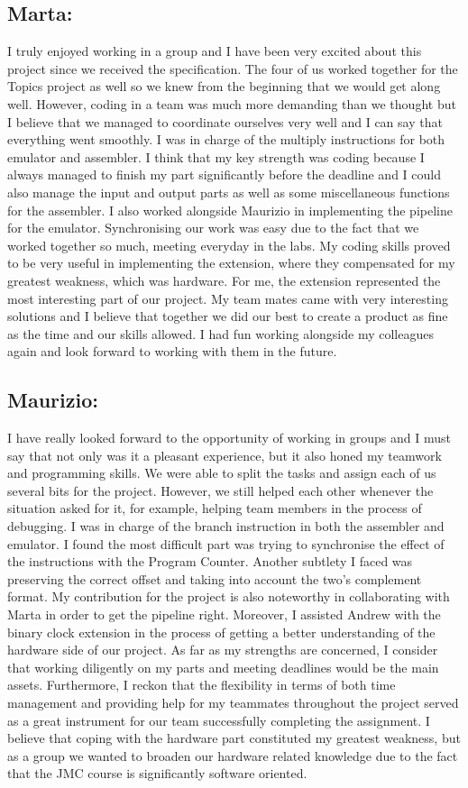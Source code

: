 \documentclass[11pt]{article}
\begin{document}
\subsection{Marta:}
I truly enjoyed working in a group and I have been very excited about this project since we received the specification.  The four of us worked together for the Topics project as well so we knew from the beginning that we would get along well. However, coding in a team was much more demanding than we thought but I believe that we managed to coordinate ourselves very well and I can say that everything went smoothly. I was in charge of the multiply instructions for both emulator and assembler. I think that my key strength was coding because I always managed to finish my part significantly before the deadline and I could also manage the input and output parts as well as some miscellaneous functions for the assembler. I also worked alongside Maurizio in implementing the pipeline for the emulator. Synchronising our work was easy due to the fact that we worked together so much, meeting everyday in the labs. My coding skills proved to be very useful in implementing the extension, where they compensated for my greatest weakness, which was hardware. For me, the extension represented the most interesting part of our project.  My team mates came with very interesting solutions and I believe that together we did our best to create a product as fine as the time and our skills allowed. I had fun working alongside my colleagues again and look forward to working with them in the future.

\subsection{Maurizio:}
I have really looked forward to the opportunity of working in groups and I must say that not only was it a pleasant experience, but it also honed my teamwork and programming skills. We were able to split the tasks and assign each of us several bits for the project. However, we still helped each other whenever the situation asked for it, for example, helping team members in the process of debugging. I was in charge of the branch instruction in both the assembler and emulator. I found the most difficult part was trying to synchronise the effect of the instructions with the Program Counter. Another subtlety I faced was preserving the correct offset and taking into account the two's complement format. My contribution for the project is also noteworthy in collaborating with Marta in order to get the pipeline right. Moreover, I assisted Andrew with the binary clock extension in the process of getting a better understanding of the hardware side of our project. As far as my strengths are concerned, I consider that working diligently on my parts and meeting deadlines would be the main assets. Furthermore, I reckon that the flexibility in terms of both time management and providing help for my teammates throughout the project served as a great instrument for our team successfully completing the assignment. I believe that coping with the hardware part constituted my greatest weakness, but as a group we wanted to broaden our hardware related knowledge due to the fact that the JMC course is significantly software oriented.
\end{document}
